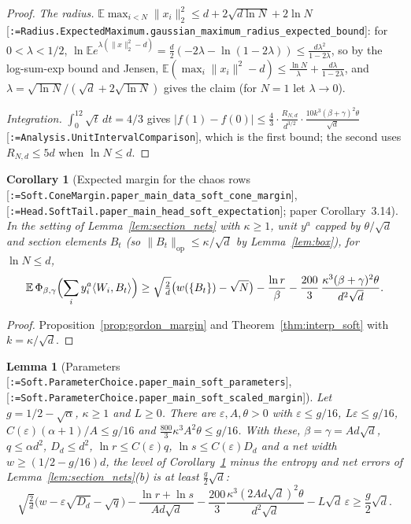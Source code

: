 \documentclass[11pt]{article}
\makeatletter
\newcommand{\formal@break}[1]{\@tfor\formal@tok:=#1\do{%
  \formal@tok
  \expandafter\ifx\formal@tok.\allowbreak\else
  \expandafter\ifx\formal@tok\_\allowbreak\fi\fi}}
\DeclareRobustCommand{\formal}[1]{\textnormal{[\texttt{\small\formal@break{#1}}]}}
\newcommand{\E}{\mathbb{E}}
\newcommand{\ip}[2]{\langle #1, #2\rangle}
\newcommand{\norm}[1]{\lVert #1\rVert}
\newcommand{\abs}[1]{\lvert #1\rvert}
\newcommand{\op}{\mathrm{op}}
\newcommand{\sqd}{\sqrt{d}}
\newcommand{\Dd}{D}
\theoremstyle{plain}
\newtheorem{lemma}[theorem]{Lemma}
\newtheorem{corollary}[theorem]{Corollary}
\theoremstyle{definition}
\makeatother
\begin{document}
\begin{proof}
\emph{The radius.} $\E\max_{i<N}\norm{x_i}_2^2 \le d + 2\sqrt{d\ln N} + 2\ln N$
\formal{Radius.ExpectedMaximum.gaussian\_maximum\_radius\_expected\_bound}:
for $0 < \lambda < 1/2$, $\ln\E e^{\lambda(\norm{x}_2^2 - d)} = \frac d2(-2\lambda - \ln(1 - 2\lambda)) \le \frac{d\lambda^2}{1 - 2\lambda}$,
so by the log-sum-exp bound and Jensen, $\E(\max_i\norm{x_i}^2 - d) \le \frac{\ln N}{\lambda} + \frac{d\lambda}{1-2\lambda}$,
and $\lambda = \sqrt{\ln N}/(\sqd + 2\sqrt{\ln N})$ gives the claim (for
$N = 1$ let $\lambda \to 0$).

\emph{Integration.} $\int_0^12\sqrt t\,dt = 4/3$ gives
$\abs{f(1) - f(0)} \le \frac{4}{3}\cdot\frac{R_{N,d}}{d^{3/2}}\cdot\frac{10k^3(\beta+\gamma)^2\theta}{\sqd}$
\formal{Analysis.UnitIntervalComparison}, which is the first bound; the
second uses $R_{N,d} \le 5d$ when $\ln N \le d$.
\end{proof}

\begin{corollary}[Expected margin for the chaos rows \formal{Soft.ConeMargin.paper\_main\_data\_soft\_cone\_margin}, \formal{Head.SoftTail.paper\_main\_head\_soft\_expectation}; paper Corollary~3.14]\label{cor:chaos_margin}
In the setting of Lemma~\ref{lem:section_nets} with $\kappa \ge 1$, unit
$y^a$ capped by $\theta/\sqd$ and section elements $B_t$ (so
$\norm{B_t}_\op \le \kappa/\sqd$ by Lemma~\ref{lem:box}), for $\ln N \le d$,
\[
\E\,\Phi_{\beta,\gamma}\Bigl(\sum_iy^a_i\ip{W_i}{B_t}\Bigr)
\ge \sqrt{\tfrac2d}\bigl(w(\{B_t\}) - \sqrt N\bigr) - \frac{\ln r}{\beta} - \frac{200}{3}\,\frac{\kappa^3(\beta+\gamma)^2\theta}{d^2\sqd}.
\]
\end{corollary}

\begin{proof}
Proposition~\ref{prop:gordon_margin} and Theorem~\ref{thm:interp_soft} with
$k = \kappa/\sqd$.
\end{proof}

\begin{lemma}[Parameters \formal{Soft.ParameterChoice.paper\_main\_soft\_parameters}, \formal{Soft.ParameterChoice.paper\_main\_soft\_scaled\_margin}]\label{lem:params}
Let $g = 1/2 - \sqrt\alpha$, $\kappa \ge 1$ and $L \ge 0$. There are
$\varepsilon, A, \theta > 0$ with $\varepsilon \le g/16$, $L\varepsilon \le g/16$,
$C(\varepsilon)(\alpha + 1)/A \le g/16$ and $\frac{800}{3}\kappa^3A^2\theta \le g/16$.
With these, $\beta = \gamma = Ad\sqd$, $q \le \alpha d^2$, $\Dd_d \le d^2$,
$\ln r \le C(\varepsilon)q$, $\ln s \le C(\varepsilon)\Dd_d$ and a net width
$w \ge (1/2 - g/16)d$, the level of Corollary~\ref{cor:chaos_margin} minus
the entropy and net errors of Lemma~\ref{lem:section_nets}(b) is at least
$\frac g2\sqd$:
\[
\sqrt{\tfrac2d}\bigl(w - \varepsilon\sqrt{\Dd_d} - \sqrt q\bigr) - \frac{\ln r + \ln s}{Ad\sqd} - \frac{200}{3}\frac{\kappa^3(2Ad\sqd)^2\theta}{d^2\sqd} - L\sqd\,\varepsilon \ge \frac g2\sqd .
\]
\end{lemma}
\end{document}
